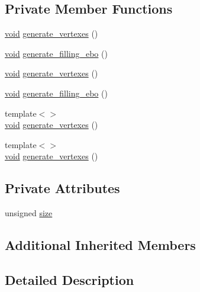 \subsection*{Private Member Functions}
\begin{DoxyCompactItemize}
\item 
\mbox{\hyperlink{glad_8h_a950fc91edb4504f62f1c577bf4727c29}{void}} \mbox{\hyperlink{classSquareBoard_a401c48fa5977d166b75e94bb7ddf1db7}{generate\+\_\+vertexes}} ()
\item 
\mbox{\hyperlink{glad_8h_a950fc91edb4504f62f1c577bf4727c29}{void}} \mbox{\hyperlink{classSquareBoard_a5d12432cc063275a6ffec42a7971abbc}{generate\+\_\+filling\+\_\+ebo}} ()
\item 
\mbox{\hyperlink{glad_8h_a950fc91edb4504f62f1c577bf4727c29}{void}} \mbox{\hyperlink{classSquareBoard_a401c48fa5977d166b75e94bb7ddf1db7}{generate\+\_\+vertexes}} ()
\item 
\mbox{\hyperlink{glad_8h_a950fc91edb4504f62f1c577bf4727c29}{void}} \mbox{\hyperlink{classSquareBoard_a5d12432cc063275a6ffec42a7971abbc}{generate\+\_\+filling\+\_\+ebo}} ()
\item 
{\footnotesize template$<$$>$ }\\\mbox{\hyperlink{glad_8h_a950fc91edb4504f62f1c577bf4727c29}{void}} \mbox{\hyperlink{classSquareBoard_a7928f781c7709b3fdfe42b5ce5bfc3f9}{generate\+\_\+vertexes}} ()
\item 
{\footnotesize template$<$$>$ }\\\mbox{\hyperlink{glad_8h_a950fc91edb4504f62f1c577bf4727c29}{void}} \mbox{\hyperlink{classSquareBoard_a7928f781c7709b3fdfe42b5ce5bfc3f9}{generate\+\_\+vertexes}} ()
\end{DoxyCompactItemize}
\subsection*{Private Attributes}
\begin{DoxyCompactItemize}
\item 
unsigned \mbox{\hyperlink{classSquareBoard_a92007159761cd4dfe85aaaa11103ea84}{size}}
\end{DoxyCompactItemize}
\subsection*{Additional Inherited Members}


\subsection{Detailed Description}

